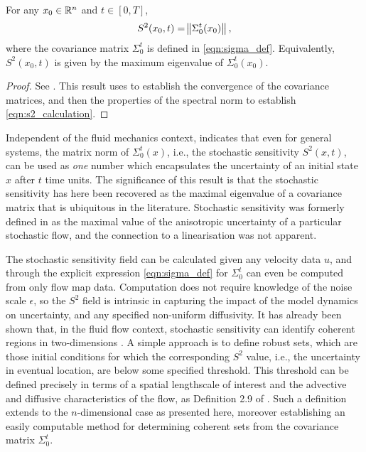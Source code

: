 \begin{theorem}[Computation of \(S^2\)]\label{thm:s2_calculation}
	For any \(x_0 \in \mathbb{R}^n\) and \(t \in [0,T]\),
	\begin{equation}
		S^2\!\left(x_0,t\right) = \norm{\Sigma_0^t\!\left(x_0\right)},
		\label{eqn:s2_calculation}
	\end{equation}
	where the covariance matrix \(\Sigma_0^t\) is defined in \cref{eqn:sigma_def}.
	Equivalently, \(S^2\!\left(x_0,t\right)\) is given by the maximum eigenvalue of \(\Sigma_0^t\!\left(x_0\right)\).
\end{theorem}
\begin{proof}
	See .
	This result uses  to establish the convergence of the covariance matrices, and then the properties of the spectral norm to establish \cref{eqn:s2_calculation}.
\end{proof}

Independent of the fluid mechanics context,  indicates that even for general systems, the matrix norm of \(\Sigma_0^t(x)\), i.e., the stochastic sensitivity \(S^2(x,t)\), can be used as {\em one} number which encapsulates the uncertainty of an initial state \(x\) after \(t\) time units.
The significance of this result is that the stochastic sensitivity has here been recovered as the maximal eigenvalue of a covariance matrix that is ubiquitous in the literature.
Stochastic sensitivity was formerly defined in \cite{Balasuriya_2020_StochasticSensitivityComputable} as the maximal value of the anisotropic uncertainty of a particular stochastic flow, and the connection to a linearisation was not apparent.

The stochastic sensitivity field can be calculated given any velocity data \(u\), and through the explicit expression \cref{eqn:sigma_def} for \(\Sigma_0^t\) can even be computed from only flow map data.
Computation does not require knowledge of the noise scale \(\epsilon\), so the \(S^2\) field is intrinsic in capturing the impact of the model dynamics on uncertainty, and any specified non-uniform diffusivity.
It has already been shown that, in the fluid flow context, stochastic sensitivity can identify coherent regions in two-dimensions \cite{BadzaEtAl_2023_HowSensitiveAre, Balasuriya_2020_StochasticSensitivityComputable}.
A simple approach is to define robust sets, which are those initial conditions for which the corresponding \(S^2\) value, i.e., the uncertainty in eventual location, are below some specified threshold.
This threshold can be defined precisely in terms of a spatial lengthscale of interest and the advective and diffusive characteristics of the flow, as Definition 2.9 of \cite{Balasuriya_2020_StochasticSensitivityComputable}.
Such a definition extends to the \(n\)-dimensional case as presented here, moreover establishing an easily computable method for determining coherent sets from the covariance matrix \(\Sigma_0^t\).


